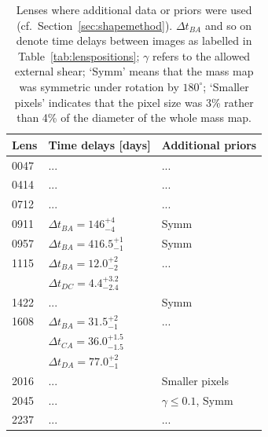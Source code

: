 \documentclass[useAMS,usenatbib]{mn2e}
\begin{document}
\begin{table}
  \begin{center}
    \begin{tabular}{l l l}
      Lens & Time delays [days] & Additional priors \\ \hline
      0047 & ... & ...\\
      0414 & ... & ...\\
      0712 & ... & ...\\
      0911 & $\Delta t_{BA}=146^{+4}_{-4}$ & Symm\\
      0957 & $\Delta t_{BA}=416.5^{+1}_{-1}$ & Symm \\
      1115 & $\Delta t_{BA}=12.0^{+2}_{-2}$ & ...\\
           & $\Delta t_{DC}=4.4^{+3.2}_{-2.4}$ & \\
      1422 & ... & Symm \\
      1608 & $\Delta t_{BA}=31.5^{+2}_{-1}$ & ...\\
           & $\Delta t_{CA}=36.0^{+1.5}_{-1.5}$ & \\
           & $\Delta t_{DA}=77.0^{+2}_{-1}$ & \\
      2016 & ... & Smaller pixels \\
      2045 & ... & $\gamma\leq 0.1$, Symm \\
      2237 & ... & ...\\
    \end{tabular}
    \caption[width=\linewidth]{Lenses where additional data or priors were used (cf.~Section~\ref{sec:shapemethod}). $\Delta t_{BA}$ and so on denote time delays between images as labelled in Table~\ref{tab:lenspositions}; $\gamma$ refers to the allowed external shear; `Symm' means that the mass map was symmetric under rotation by $180^\circ$; `Smaller pixels' indicates that the pixel size was 3\% rather than 4\% of the diameter of the whole mass map.}
    \label{tab:lenspriors}
  \end{center}
\end{table}
\end{document}
